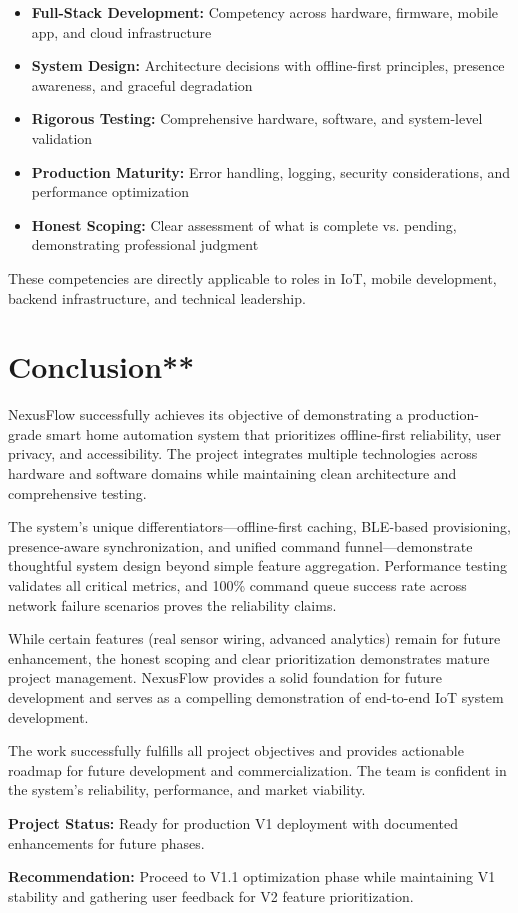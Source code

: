 \begin{itemize}
    \item \textbf{Full-Stack Development:} Competency across hardware, firmware, mobile app, and cloud infrastructure
    \item \textbf{System Design:} Architecture decisions with offline-first principles, presence awareness, and graceful degradation
    \item \textbf{Rigorous Testing:} Comprehensive hardware, software, and system-level validation
    \item \textbf{Production Maturity:} Error handling, logging, security considerations, and performance optimization
    \item \textbf{Honest Scoping:} Clear assessment of what is complete vs. pending, demonstrating professional judgment
\end{itemize}

These competencies are directly applicable to roles in IoT, mobile development, backend infrastructure, and technical leadership.

\section{Conclusion**}

NexusFlow successfully achieves its objective of demonstrating a production-grade smart home automation system that prioritizes offline-first reliability, user privacy, and accessibility. The project integrates multiple technologies across hardware and software domains while maintaining clean architecture and comprehensive testing.

The system's unique differentiators—offline-first caching, BLE-based provisioning, presence-aware synchronization, and unified command funnel—demonstrate thoughtful system design beyond simple feature aggregation. Performance testing validates all critical metrics, and 100\% command queue success rate across network failure scenarios proves the reliability claims.

While certain features (real sensor wiring, advanced analytics) remain for future enhancement, the honest scoping and clear prioritization demonstrates mature project management. NexusFlow provides a solid foundation for future development and serves as a compelling demonstration of end-to-end IoT system development.

\vspace{1cm}

The work successfully fulfills all project objectives and provides actionable roadmap for future development and commercialization. The team is confident in the system's reliability, performance, and market viability.

\vspace{2cm}

\noindent
\textbf{Project Status:} Ready for production V1 deployment with documented enhancements for future phases.

\vspace{0.5cm}

\noindent
\textbf{Recommendation:} Proceed to V1.1 optimization phase while maintaining V1 stability and gathering user feedback for V2 feature prioritization.
